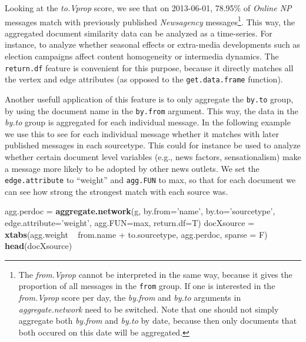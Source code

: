 \documentclass[]{article}
\newenvironment{Shaded}{\begin{snugshade}}{\end{snugshade}}
\newcommand{\KeywordTok}[1]{\textcolor[rgb]{0.13,0.29,0.53}{\textbf{{#1}}}}
\newcommand{\DataTypeTok}[1]{\textcolor[rgb]{0.13,0.29,0.53}{{#1}}}
\newcommand{\StringTok}[1]{\textcolor[rgb]{0.31,0.60,0.02}{{#1}}}
\newcommand{\NormalTok}[1]{{#1}}
\let\rmarkdownfootnote\footnote%
\def\footnote{\protect\rmarkdownfootnote}
\begin{document}
Looking at the \emph{to.Vprop} score, we see that on 2013-06-01, 78.95\%
of \emph{Online NP} messages match with previously published
\emph{Newsagency} messages\footnote{The \emph{from.Vprop} cannot be
  interpreted in the same way, because it gives the proportion of all
  messages in the \texttt{from} group. If one is interested in the
  \emph{from.Vprop} score per day, the \emph{by.from} and \emph{by.to}
  arguments in \emph{aggregate.network} need to be switched. Note that
  one should not simply aggregate both \emph{by.from} and \emph{by.to}
  by date, because then only documents that both occured on this date
  will be aggregated.}. This way, the aggregated document similarity
data can be analyzed as a time-series. For instance, to analyze whether
seasonal effects or extra-media developments such as election campaigns
affect content homogeneity or intermedia dynamics. The
\texttt{return.df} feature is convenient for this purpose, because it
directly matches all the vertex and edge attributes (as opposed to the
\texttt{get.data.frame} function).

Another usefull application of this feature is to only aggregate the
\texttt{by.to} group, by using the document name in the \texttt{by.from}
argument. This way, the data in the \emph{by.to} group is aggregated for
each individual message. In the following example we use this to see for
each individual message whether it matches with later published messages
in each sourcetype. This could for instance be used to analyze whether
certain document level variables (e.g., news factors, sensationalism)
make a message more likely to be adopted by other news outlets. We set
the \texttt{edge.attribute} to ``weight'' and \texttt{agg.FUN} to max,
so that for each document we can see how strong the strongest match with
each source was.

\begin{Shaded}
\begin{Highlighting}[]
\NormalTok{agg.perdoc =}\StringTok{ }\KeywordTok{aggregate.network}\NormalTok{(g, }\DataTypeTok{by.from=}\StringTok{'name'}\NormalTok{, }\DataTypeTok{by.to=}\StringTok{'sourcetype'}\NormalTok{, }
                                  \DataTypeTok{edge.attribute=}\StringTok{'weight'}\NormalTok{, }\DataTypeTok{agg.FUN=}\NormalTok{max, }
                                  \DataTypeTok{return.df=}\NormalTok{T)}
\NormalTok{docXsource =}\StringTok{ }\KeywordTok{xtabs}\NormalTok{(agg.weight ~}\StringTok{ }\NormalTok{from.name +}\StringTok{ }\NormalTok{to.sourcetype, agg.perdoc, }\DataTypeTok{sparse =} \NormalTok{F)}
\KeywordTok{head}\NormalTok{(docXsource)}
\end{Highlighting}
\end{Shaded}
\end{document}
